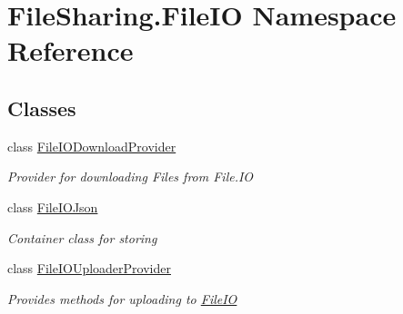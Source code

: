 \hypertarget{namespace_file_sharing_1_1_file_i_o}{}\section{File\+Sharing.\+File\+IO Namespace Reference}
\label{namespace_file_sharing_1_1_file_i_o}
\subsection*{Classes}
\begin{DoxyCompactItemize}
\item 
class \hyperlink{class_file_sharing_1_1_file_i_o_1_1_file_i_o_download_provider}{File\+I\+O\+Download\+Provider}
\begin{DoxyCompactList}\small\item\em Provider for downloading Files from File.\+IO \end{DoxyCompactList}\item 
class \hyperlink{class_file_sharing_1_1_file_i_o_1_1_file_i_o_json}{File\+I\+O\+Json}
\begin{DoxyCompactList}\small\item\em Container class for storing \end{DoxyCompactList}\item 
class \hyperlink{class_file_sharing_1_1_file_i_o_1_1_file_i_o_uploader_provider}{File\+I\+O\+Uploader\+Provider}
\begin{DoxyCompactList}\small\item\em Provides methods for uploading to \hyperlink{namespace_file_sharing_1_1_file_i_o}{File\+IO} \end{DoxyCompactList}\end{DoxyCompactItemize}
